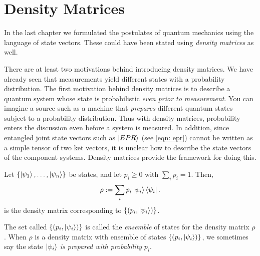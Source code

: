 
\chapter{Density Matrices} %

\label{Chapter4-density matrix} %


In the last chapter we formulated the postulates of quantum mechanics using the language of state vectors. These could have been stated using \textit{density matrices} as well. 

There are at least two motivations behind introducing density matrices. We have already seen that measurements yield different states with a probability distribution. The first motivation behind density matrices is to describe a quantum system whose state is probabilistic {\emph{even prior to measurement}}. You can imagine a source such as a machine that \emph{prepares} different quantum states subject to a probability distribution. Thus with density matrices, probability enters the discussion even before a system is measured.
In addition, since entangled joint state vectors such as $\ket{EPR}$ (see \eqref{eqn: epr}) cannot be written as a simple tensor of two ket vectors, it is unclear how to describe the state vectors of the component systems.  Density matrices provide the framework for doing this. 

\begin{definition}
Let $\{\ket{\psi_1},\hdots,\ket{\psi_n}\}$ be states, and let $p_i\geq 0$ with $\sum\limits_i p_i=1$.
Then, 
\begin{equation}
    \rho:=\sum_i p_i \ket{\psi_i}\bra{\psi_i}.
\end{equation}
is the density matrix corresponding to $\{(p_i, \ket{\psi_i})\}$. 
\end{definition}
The set called $\{(p_i, \ket{\psi_i})\}$ is called the \textit{ensemble} of states for the density matrix $\rho$.  When $\rho$ is a density matrix with ensemble of states $\{(p_i, \ket{\psi_i})\}$, we sometimes say the state $\ket{\psi_i}$ {\emph{is prepared with probability}} $p_i$.

